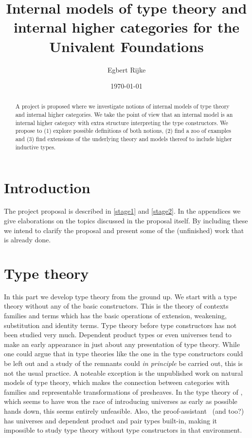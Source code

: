 \documentclass{article}
\title{Internal models of type theory and internal higher categories for the
Univalent Foundations}
\author{Egbert Rijke}
\date{\today}
\begin{document}
\maketitle

\begin{abstract}
A project is proposed where we investigate notions of internal models of type
theory and internal higher categories. We take the point of view that an
internal model is an internal higher category with extra structure interpreting
the type constructors. We propose to (1) explore possible definitions of both
notions, (2) find a zoo of examples and (3) find extensions of the underlying
theory and models thereof to include higher inductive types.
\end{abstract}

\tableofcontents

\part{Introduction}
The project proposal is described in \autoref{stage1} and \autoref{stage2}. In
the appendices we give elaborations on the topics discussed in the proposal itself.
By including these we intend to clarify the proposal and present some of the 
(unfinished) work that is already done.





%

\part{Type theory}

In this part we develop type theory from the ground up. We start with a type
theory without any of the basic constructors. This is the theory of contexts
families and terms which has the basic operations of extension, weakening,
substitution and identity terms. Type theory before type constructors has not
been studied very much. Dependent product types or even universes tend to make
an early appearance in just about any presentation of type theory. While one
could argue that in type theories like the one in \cite{Dybjer1996} the type
constructors could be left out and a study of the remnants could \emph{in
principle} be carried out, this is not the usual practice. A noteable exception
is the unpublished work \cite{Awodey2013} on natural models of type theory,
which makes the connection between categories with families and representable
transformations of presheaves. In the type theory
of \cite{TheBook}, which seems to have won the race of introducing universes
as early as possible hands down, this seems entirely unfeasible. Also, the 
proof-assistant \Coq\ {\color{red}(and \Agda too?)} has universes and dependent product and pair types 
built-in, making it impossible to study type theory without type constructors in 
that environment.
\end{document}
